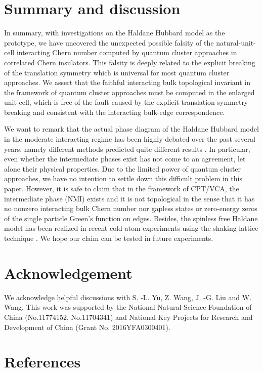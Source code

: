 \documentclass[12pt]{iopart}
\begin{document}
\section{Summary and discussion}\label{SD}

\par In summary, with investigations on the Haldane Hubbard model as the prototype, we have uncovered the unexpected possible falsity of the natural-unit-cell interacting Chern number computed by quantum cluster approaches in correlated Chern insulators. This falsity is deeply related to the explicit breaking of the translation symmetry which is universal for most quantum cluster approaches. We assert that the faithful interacting bulk topological invariant in the framework of quantum cluster approaches must be computed in the enlarged unit cell, which is free of the fault caused by the explicit translation symmetry breaking and consistent with the interacting bulk-edge correspondence.

\par We want to remark that the actual phase diagram of the Haldane Hubbard model in the moderate interacting regime has been highly debated over the past several years, namely different methods predicted quite different results \cite{HZKL_PRB2011-1,HZKL_PRB2011-2,MR_PRB2013,HRP_PRB2015,ZSWZ_PRB2015,HCPP_PRL2016,VSLTHT_PRL2016,IWT_PRB2016,ASHP_PRB2016,GJMP_PRB2016,GR_NJP2018,LTTNNH_PBCM2018}. In particular, even whether the intermediate phases exist has not come to an agreement, let alone their physical properties. Due to the limited power of quantum cluster approaches, we have no intention to settle down this difficult problem in this paper. However, it is safe to claim that in the framework of CPT/VCA, the intermediate phase (NMI) exists and it is not topological in the sense that it has no nonzero interacting bulk Chern number nor gapless states or zero-energy zeros of the single particle Green's function on edges. Besides, the spinless free Haldane model has been realized in recent cold atom experiments using the shaking lattice technique \cite{JMDRLUGE_N2014}. We hope our claim can be tested in future experiments.


\section*{Acknowledgement}
\par We acknowledge helpful discussions with S. -L. Yu, Z. Wang, J. -G. Liu and W. Wang. This work was supported by the National Natural Science Foundation of China (No.11774152, No.11704341) and National Key Projects for Research and Development of China (Grant No. 2016YFA0300401).

\section*{References}

\end{document}
